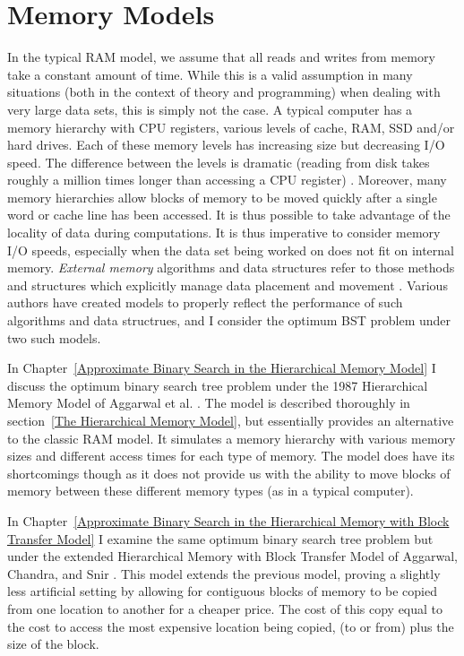 \documentclass[letterpaper,12pt,titlepage,oneside,final]{book}
\theoremstyle{plain}
\begin{document}
\section{Memory Models}

In the typical RAM model, we assume that all reads and writes from memory take a constant amount of time. While this is a valid assumption in many situations (both in the context of theory and programming) when dealing with very large data sets, this is simply not the case. A typical computer has a memory hierarchy with CPU registers, various levels of cache, RAM, SSD and/or hard drives. Each of these memory levels has increasing size but decreasing I/O speed. The difference between the levels is dramatic (reading from disk takes roughly a million times longer than accessing a CPU register) \cite{vitter2001external}. Moreover, many memory hierarchies allow blocks of memory to be moved quickly after a single word or cache line has been accessed. It is thus possible to take advantage of the locality of data during computations. It is thus imperative to consider memory I/O speeds, especially when the data set being worked on does not fit on internal memory. \textit{External memory} algorithms and data structures refer to those methods and structures which explicitly manage data placement and movement \cite{vitter2001external}. Various authors have created models to properly reflect the performance of such algorithms and data structrues, and I consider the optimum BST problem under two such models.

In Chapter~\ref{Approximate Binary Search in the Hierarchical Memory Model} I discuss the optimum binary search tree problem under the 1987 Hierarchical Memory Model of Aggarwal et al. \cite{aggarwal1987model}. The model is described thoroughly in section~\ref{The Hierarchical Memory Model}, but essentially provides an alternative to the classic RAM model. It simulates a memory hierarchy with various memory sizes and different access times for each type of memory. The model does have its shortcomings though as it does not provide us with the ability to move blocks of memory between these different memory types (as in a typical computer). 

In Chapter~\ref{Approximate Binary Search in the Hierarchical Memory with Block Transfer Model} I examine the same optimum binary search tree problem but under the extended Hierarchical Memory with Block Transfer Model of Aggarwal, Chandra, and Snir \cite{aggarwal1987hierarchical}. This model extends the previous model, proving a slightly less artificial setting by allowing for contiguous blocks of memory to be copied from one location to another for a cheaper price. The cost of this copy equal to the cost to access the most expensive location being copied, (to or from) plus the size of the block. \\
\end{document}
